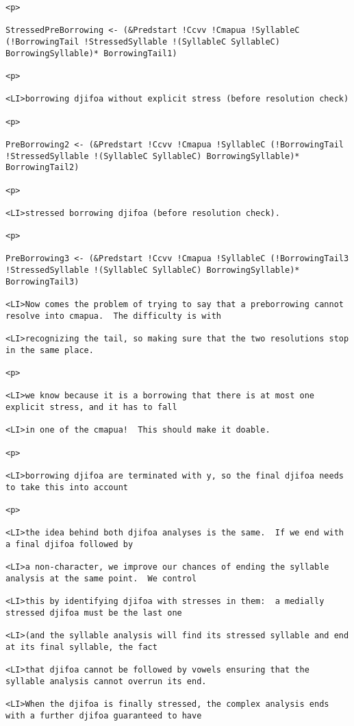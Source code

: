 \documentclass[12pt]{article}
\begin{document}
\begin{lstlisting}
<p>

StressedPreBorrowing <- (&Predstart !Ccvv !Cmapua !SyllableC (!BorrowingTail !StressedSyllable !(SyllableC SyllableC) BorrowingSyllable)* BorrowingTail1)

<p>

<LI>borrowing djifoa without explicit stress (before resolution check)

<p>

PreBorrowing2 <- (&Predstart !Ccvv !Cmapua !SyllableC (!BorrowingTail !StressedSyllable !(SyllableC SyllableC) BorrowingSyllable)* BorrowingTail2)

<p>

<LI>stressed borrowing djifoa (before resolution check).

<p>

PreBorrowing3 <- (&Predstart !Ccvv !Cmapua !SyllableC (!BorrowingTail3 !StressedSyllable !(SyllableC SyllableC) BorrowingSyllable)* BorrowingTail3)

<LI>Now comes the problem of trying to say that a preborrowing cannot resolve into cmapua.  The difficulty is with

<LI>recognizing the tail, so making sure that the two resolutions stop in the same place.

<p>

<LI>we know because it is a borrowing that there is at most one explicit stress, and it has to fall

<LI>in one of the cmapua!  This should make it doable.

<p>

<LI>borrowing djifoa are terminated with y, so the final djifoa needs to take this into account

<p>

<LI>the idea behind both djifoa analyses is the same.  If we end with a final djifoa followed by

<LI>a non-character, we improve our chances of ending the syllable analysis at the same point.  We control

<LI>this by identifying djifoa with stresses in them:  a medially stressed djifoa must be the last one

<LI>(and the syllable analysis will find its stressed syllable and end at its final syllable, the fact

<LI>that djifoa cannot be followed by vowels ensuring that the syllable analysis cannot overrun its end.

<LI>When the djifoa is finally stressed, the complex analysis ends with a further djifoa guaranteed to have


\end{lstlisting}
\end{document}
